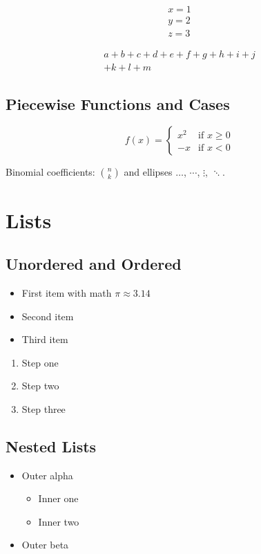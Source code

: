 \documentclass{article}
\begin{document}
\begin{gather}
    x = 1 \\
    y = 2 \\
    z = 3
\end{gather}

\begin{multline}
    a + b + c + d + e + f + g + h + i + j \\
    + k + l + m
\end{multline}

\subsection{Piecewise Functions and Cases}
\[
    f(x) = \begin{cases}
        x^2  & \text{if } x \geq 0 \\
        -x   & \text{if } x < 0
    \end{cases}
\]

Binomial coefficients: $\binom{n}{k}$ and ellipses $\ldots$, $\cdots$, $\vdots$, $\ddots$.

\section{Lists}

\subsection{Unordered and Ordered}
\begin{itemize}
    \item First item with math $\pi \approx 3.14$
    \item Second item
    \item Third item
\end{itemize}

\begin{enumerate}
    \item Step one
    \item Step two
    \item Step three
\end{enumerate}

\subsection{Nested Lists}
\begin{itemize}
    \item Outer alpha
    \begin{itemize}
        \item Inner one
        \item Inner two
    \end{itemize}
    \item Outer beta
\end{itemize}
\end{document}
